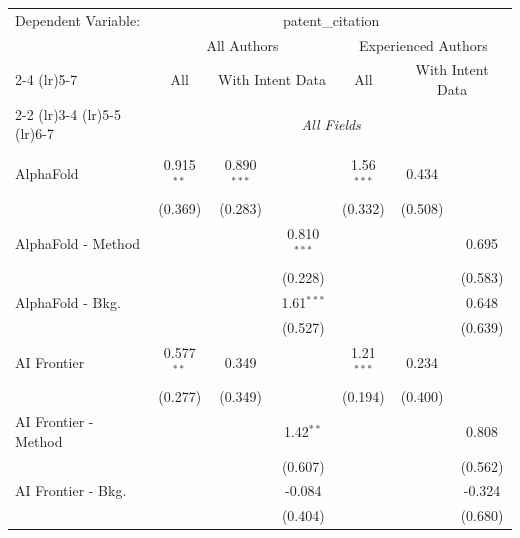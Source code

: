 \begingroup
\centering
\begin{tabular}{lcccccc}
   \tabularnewline \midrule \midrule
   Dependent Variable: & \multicolumn{6}{c}{patent\_citation}\\
 & \multicolumn{3}{c}{All Authors} & \multicolumn{3}{c}{Experienced Authors} \\
\cmidrule(lr){2-4} \cmidrule(lr){5-7}
 & \multicolumn{1}{c}{All} & \multicolumn{2}{c}{With Intent Data} & \multicolumn{1}{c}{All} & \multicolumn{2}{c}{With Intent Data} \\
\cmidrule(lr){2-2} \cmidrule(lr){3-4} \cmidrule(lr){5-5} \cmidrule(lr){6-7}
 & \multicolumn{6}{c}{\textit{All Fields}} \\ \\
   AlphaFold            & 0.915$^{**}$ & 0.890$^{***}$ &               & 1.56$^{***}$ & 0.434        &   \\   
                        & (0.369)      & (0.283)       &               & (0.332)      & (0.508)      &   \\   
   AlphaFold - Method   &              &               & 0.810$^{***}$ &              &              & 0.695\\   
                        &              &               & (0.228)       &              &              & (0.583)\\   
   AlphaFold - Bkg.     &              &               & 1.61$^{***}$  &              &              & 0.648\\   
                        &              &               & (0.527)       &              &              & (0.639)\\   
   AI Frontier          & 0.577$^{**}$ & 0.349         &               & 1.21$^{***}$ & 0.234        &   \\   
                        & (0.277)      & (0.349)       &               & (0.194)      & (0.400)      &   \\   
   AI Frontier - Method &              &               & 1.42$^{**}$   &              &              & 0.808\\   
                        &              &               & (0.607)       &              &              & (0.562)\\   
   AI Frontier - Bkg.   &              &               & -0.084        &              &              & -0.324\\   
                        &              &               & (0.404)       &              &              & (0.680)\\   

\end{tabular}
